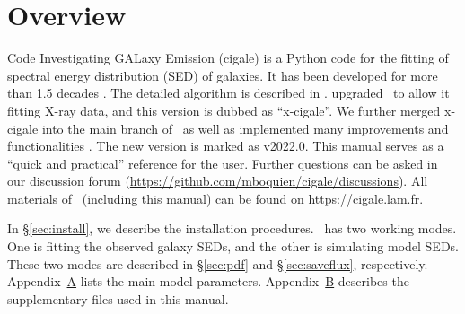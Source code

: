 \section{Overview}\label{sec:overview}
Code Investigating GALaxy Emission ({\sc cigale}) is a Python code for the fitting of spectral energy distribution (SED) of galaxies. 
It has been developed for more than 1.5 decades \citep[e.g.][]{burgarella05, noll09, serra11, roehlly14, boquien19}. 
The detailed algorithm is described in \cite{boquien19}.
\cite{yang20} upgraded \xcig\ to allow it fitting X-ray data, and this version is dubbed as ``{\sc x-cigale}''.
We further merged {\sc x-cigale} into the main branch of \xcig\ as well as implemented many improvements and functionalities \citep{yang22}.
The new version is marked as v2022.0.
This manual serves as a ``quick and practical'' reference for the user.
Further questions can be asked in our discussion forum (\url{https://github.com/mboquien/cigale/discussions}).
All materials of \xcig\ (including this manual) can be found on \url{https://cigale.lam.fr}.

In \S\ref{sec:install}, we describe the installation procedures.
\xcig\ has two working modes.
One is fitting the observed galaxy SEDs, and the other is simulating model SEDs. 
These two modes are described in \S\ref{sec:pdf} and \S\ref{sec:saveflux}, respectively. 
Appendix~\hyperref[app:par]{A} lists the main model parameters.
Appendix~\hyperref[app:file]{B} describes the supplementary files used in this manual. 



